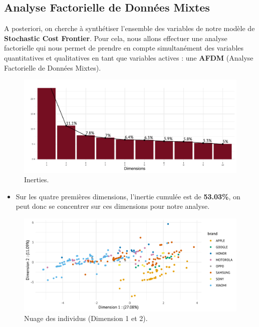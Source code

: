\documentclass[
  12pt,
]{report}
\providecommand{\tightlist}{%
  \setlength{\itemsep}{0pt}\setlength{\parskip}{0pt}}\usepackage{longtable,booktabs,array}
\begin{document}
\subsection{Analyse Factorielle de Données
Mixtes}\label{analyse-factorielle-de-donnuxe9es-mixtes}

A posteriori, on cherche à synthétiser l'ensemble des variables de notre
modèle de \textbf{Stochastic Cost Frontier}. Pour cela, nous allons
effectuer une analyse factorielle qui nous permet de prendre en compte
simultanément des variables quantitatives et qualitatives en tant que
variables actives : une \textbf{AFDM} (Analyse Factorielle de Données
Mixtes).

\begin{figure}[H]

{\centering \includegraphics{report_files/figure-pdf/unnamed-chunk-13-1.pdf}

}

\caption{Inerties.}

\end{figure}%

\begin{itemize}
\tightlist
\item
  Sur les quatre premières dimensions, l'inertie cumulée est de
  \textbf{53.03\%}, on peut donc se concentrer sur ces dimensions pour
  notre analyse.
\end{itemize}

\begin{figure}[H]

{\centering \includegraphics{report_files/figure-pdf/unnamed-chunk-14-1.pdf}

}

\caption{Nuage des individus (Dimension 1 et 2).}

\end{figure}%
\end{document}
